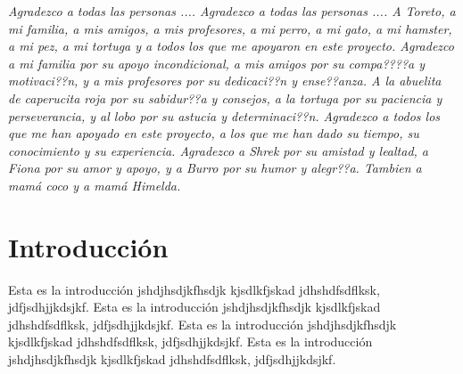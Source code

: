 \documentclass[12pt,letterpaper,spanish]{report}
\newenvironment{dedication}{\newpage\large\null\em\vskip1in}%
{\vfill}
\begin{document}
        \thispagestyle{empty}

        \begin{dedication}
           Agradezco a todas las personas .... Agradezco a todas las personas ....
           A Toreto, a mi familia, a mis amigos, a mis profesores, a mi perro, a mi gato, a mi hamster, a mi pez, a mi tortuga y a todos los que me apoyaron en este proyecto.
           Agradezco a mi familia por su apoyo incondicional, a mis amigos por su compa????a y motivaci??n, y a mis profesores por su dedicaci??n y ense??anza.
           A la abuelita de caperucita roja por su sabidur??a y consejos, a la tortuga por su paciencia y perseverancia, y al lobo por su astucia y determinaci??n.
           Agradezco a todos los que me han apoyado en este proyecto, a los que me han dado su tiempo, su conocimiento y su experiencia.
           Agradezco a Shrek por su amistad y lealtad, a Fiona por su amor y apoyo, y a Burro por su humor y alegr??a.
           Tambien a mamá coco y a mamá Himelda.
        \end{dedication}




\tableofcontents



\oddsidemargin 0.2in \textwidth 6.5in \topmargin -0.25in
\textheight 9in \pagestyle{myheadings}

\newpage



\chapter{Introducción}
\newpage


Esta es la introducción jshdjhsdjkfhsdjk kjsdlkfjskad jdhshdfsdflksk, jdfjsdhjjkdsjkf.
Esta es la introducción jshdjhsdjkfhsdjk kjsdlkfjskad jdhshdfsdflksk, jdfjsdhjjkdsjkf.
Esta es la introducción jshdjhsdjkfhsdjk kjsdlkfjskad jdhshdfsdflksk, jdfjsdhjjkdsjkf.
Esta es la introducción jshdjhsdjkfhsdjk kjsdlkfjskad jdhshdfsdflksk, jdfjsdhjjkdsjkf.
\\
\end{document}
